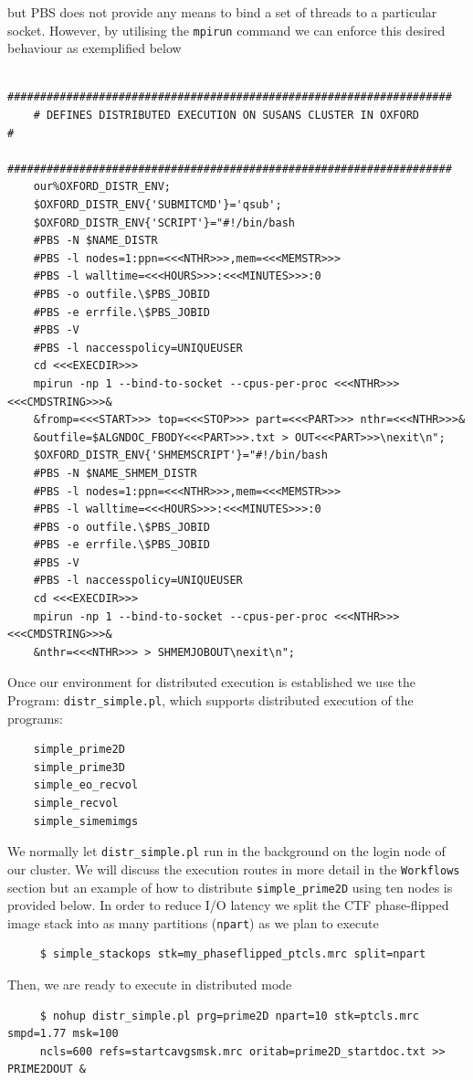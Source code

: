 \documentclass[a4paper,11pt]{article}
\newcommand{\prgname}[1]{\textcolor{NavyBlue}{\texttt{#1}}}
\begin{document}
but PBS does not provide any means to bind a set of threads to a particular socket. However, by utilising the \texttt{mpirun} command we can enforce this desired behaviour as exemplified below
\begin{verbatim}
    ####################################################################
    # DEFINES DISTRIBUTED EXECUTION ON SUSANS CLUSTER IN OXFORD        #
    ####################################################################
    our%OXFORD_DISTR_ENV;
    $OXFORD_DISTR_ENV{'SUBMITCMD'}='qsub';
    $OXFORD_DISTR_ENV{'SCRIPT'}="#!/bin/bash
    #PBS -N $NAME_DISTR
    #PBS -l nodes=1:ppn=<<<NTHR>>>,mem=<<<MEMSTR>>>
    #PBS -l walltime=<<<HOURS>>>:<<<MINUTES>>>:0
    #PBS -o outfile.\$PBS_JOBID
    #PBS -e errfile.\$PBS_JOBID
    #PBS -V
    #PBS -l naccesspolicy=UNIQUEUSER
    cd <<<EXECDIR>>> 
    mpirun -np 1 --bind-to-socket --cpus-per-proc <<<NTHR>>> <<<CMDSTRING>>>&
    &fromp=<<<START>>> top=<<<STOP>>> part=<<<PART>>> nthr=<<<NTHR>>>&
    &outfile=$ALGNDOC_FBODY<<<PART>>>.txt > OUT<<<PART>>>\nexit\n";
    $OXFORD_DISTR_ENV{'SHMEMSCRIPT'}="#!/bin/bash
    #PBS -N $NAME_SHMEM_DISTR
    #PBS -l nodes=1:ppn=<<<NTHR>>>,mem=<<<MEMSTR>>>
    #PBS -l walltime=<<<HOURS>>>:<<<MINUTES>>>:0
    #PBS -o outfile.\$PBS_JOBID
    #PBS -e errfile.\$PBS_JOBID
    #PBS -V
    #PBS -l naccesspolicy=UNIQUEUSER
    cd <<<EXECDIR>>> 
    mpirun -np 1 --bind-to-socket --cpus-per-proc <<<NTHR>>> <<<CMDSTRING>>>&
    &nthr=<<<NTHR>>> > SHMEMJOBOUT\nexit\n";
\end{verbatim}
Once our environment for distributed execution is established we use the {Program: \prgname{distr\_simple.pl}}, which supports distributed execution of the programs:
\begin{verbatim}
    simple_prime2D
    simple_prime3D
    simple_eo_recvol
    simple_recvol
    simple_simemimgs
\end{verbatim}
We normally let \prgname{distr\_simple.pl} run in the background on the login node of our cluster. We will discuss the execution routes in more detail in the \texttt{Workflows} section but an example of how to distribute \prgname{simple\_prime2D} using ten nodes is provided below. In order to reduce I/O latency we split the CTF phase-flipped image stack into as many partitions (\texttt{npart}) as we plan to execute
\begin{verbatim}
     $ simple_stackops stk=my_phaseflipped_ptcls.mrc split=npart
\end{verbatim}
Then, we are ready to execute in distributed mode
\begin{verbatim}
     $ nohup distr_simple.pl prg=prime2D npart=10 stk=ptcls.mrc smpd=1.77 msk=100
     ncls=600 refs=startcavgsmsk.mrc oritab=prime2D_startdoc.txt >> PRIME2DOUT &
\end{verbatim}
\end{document}
